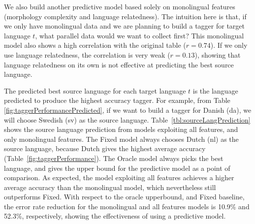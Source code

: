 We also build another predictive model based solely on monolingual features (morphology complexity and language relatedness). The intuition here is that, if we only have monolingual data and we are planning to build a tagger for target language $t$, what parallel data would we want to collect first? This monolingual model also shows a high correlation with the original table ($r=0.74$). If we only use language relatedness, the correlation is very weak ($r=0.13$), showing that language relatedness on its own is not effective at predicting the best source language.

The predicted best source language for each target language $t$ is the language predicted to produce the highest accuracy tagger. For example, from Table \ref{fig:taggerPerformancePredicted}, if we want to build a tagger for Danish (da), we will choose Swedish (sv) as the source language. Table~\ref{tbl:sourceLangPrediction} shows the source language prediction from models exploiting all features, and only monolingual features. The Fixed model always chooses Dutch (nl) as the source language, because Dutch gives the highest average accuracy (Table~\ref{fig:taggerPerformance}). The Oracle model always picks the best language, and gives the upper bound for the predictive model as a point of comparison. As expected, the model exploiting all features achieves a higher average accuracy than the monolingual model, which nevertheless still outperforms Fixed. With respect to the oracle upperbound, and Fixed baseline, the error rate reduction for the monolingual and all features models is 10.9\% and 52.3\%, respectively, showing the effectiveness of using a predictive model.


